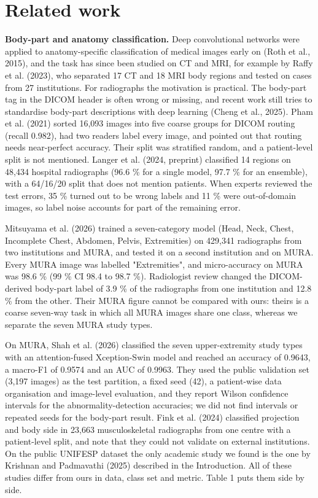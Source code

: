 \section{Related work}
\textbf{Body-part and anatomy classification.} Deep convolutional networks were applied to anatomy-specific classification of medical images early on (Roth et al., 2015), and the task has since been studied on CT and MRI, for example by Raffy et al. (2023), who separated 17 CT and 18 MRI body regions and tested on cases from 27 institutions. For radiographs the motivation is practical. The body-part tag in the DICOM header is often wrong or missing, and recent work still tries to standardise body-part descriptions with deep learning (Cheng et al., 2025). Pham et al. (2021) sorted 16,093 images into five coarse groups for DICOM routing (recall 0.982), had two readers label every image, and pointed out that routing needs near-perfect accuracy. Their split was stratified random, and a patient-level split is not mentioned. Langer et al. (2024, preprint) classified 14 regions on 48,434 hospital radiographs (96.6 \% for a single model, 97.7 \% for an ensemble), with a 64/16/20 split that does not mention patients. When experts reviewed the test errors, 35 \% turned out to be wrong labels and 11 \% were out-of-domain images, so label noise accounts for part of the remaining error.

Mitsuyama et al. (2026) trained a seven-category model (Head, Neck, Chest, Incomplete Chest, Abdomen, Pelvis, Extremities) on 429,341 radiographs from two institutions and MURA, and tested it on a second institution and on MURA. Every MURA image was labelled "Extremities", and micro-accuracy on MURA was 98.6 \% (99 \% CI 98.4 to 98.7 \%). Radiologist review changed the DICOM-derived body-part label of 3.9 \% of the radiographs from one institution and 12.8 \% from the other. Their MURA figure cannot be compared with ours: theirs is a coarse seven-way task in which all MURA images share one class, whereas we separate the seven MURA study types.

On MURA, Shah et al. (2026) classified the seven upper-extremity study types with an attention-fused Xception-Swin model and reached an accuracy of 0.9643, a macro-F1 of 0.9574 and an AUC of 0.9963. They used the public validation set (3,197 images) as the test partition, a fixed seed (42), a patient-wise data organisation and image-level evaluation, and they report Wilson confidence intervals for the abnormality-detection accuracies; we did not find intervals or repeated seeds for the body-part result. Fink et al. (2024) classified projection and body side in 23,663 musculoskeletal radiographs from one centre with a patient-level split, and note that they could not validate on external institutions. On the public UNIFESP dataset the only academic study we found is the one by Krishnan and Padmavathi (2025) described in the Introduction. All of these studies differ from ours in data, class set and metric. Table 1 puts them side by side.

